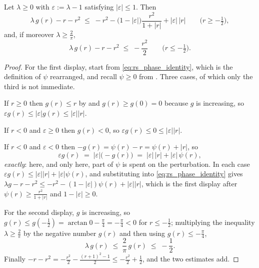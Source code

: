 \begin{lemma}
\label{lem:rs_arctan_perturbed_sharp}
\leanok
{}
Let $\lambda\ge0$ with $\varepsilon:=\lambda-1$ satisfying $\lvert\varepsilon\rvert\le1$.  Then
\[
  \lambda\,g(r)-r-r^{2}\;\le\;-r^{2}
    -\bigl(1-\lvert\varepsilon\rvert\bigr)\frac{r^{2}}{1+\lvert r\rvert}
    +\lvert\varepsilon\rvert\,\lvert r\rvert
  \qquad\bigl(r\ge-\tfrac12\bigr),
\]
and, if moreover $\lambda\ge\tfrac2\pi$,
\[
  \lambda\,g(r)-r-r^{2}\;\le\;-\frac{r^{2}}2\qquad\bigl(r\le-\tfrac12\bigr).
\]
\end{lemma}

\begin{proof}
\leanok
{}
For the first display, start from \eqref{eq:rs_phase_identity}, which is the definition of
$\psi$ rearranged, and recall $\psi\ge0$ from .  Three cases, of which
only the third is not immediate.

If $r\ge0$ then $g(r)\le r$ by  and $g(r)\ge g(0)=0$ because $g$
is increasing, so
$\varepsilon g(r)\le\lvert\varepsilon\rvert g(r)\le\lvert\varepsilon\rvert\lvert r\rvert$.

If $r<0$ and $\varepsilon\ge0$ then $g(r)<0$, so
$\varepsilon g(r)\le0\le\lvert\varepsilon\rvert\lvert r\rvert$.

If $r<0$ and $\varepsilon<0$ then $-g(r)=\psi(r)-r=\psi(r)+\lvert r\rvert$, so
\[
  \varepsilon g(r)\;=\;\lvert\varepsilon\rvert\bigl(-g(r)\bigr)
    \;=\;\lvert\varepsilon\rvert\,\lvert r\rvert+\lvert\varepsilon\rvert\,\psi(r) ,
\]
\emph{exactly}: here, and only here, part of $\psi$ is spent on the perturbation.  In each case
$\varepsilon g(r)\le\lvert\varepsilon\rvert\lvert r\rvert+\lvert\varepsilon\rvert\psi(r)$, and
substituting into \eqref{eq:rs_phase_identity} gives
$\lambda g-r-r^{2}\le-r^{2}-(1-\lvert\varepsilon\rvert)\psi(r)+\lvert\varepsilon\rvert\lvert r\rvert$,
which is the first display after $\psi(r)\ge\tfrac{r^{2}}{1+\lvert r\rvert}$ and
$1-\lvert\varepsilon\rvert\ge0$.

For the second display, $g$ is increasing, so $g(r)\le g(-\tfrac12)=\arctan0-\tfrac\pi4
=-\tfrac\pi4<0$ for $r\le-\tfrac12$; multiplying the inequality $\lambda\ge\tfrac2\pi$ by the
negative number $g(r)$ and then using $g(r)\le-\tfrac\pi4$,
\[
  \lambda\,g(r)\;\le\;\frac2\pi\,g(r)\;\le\;-\frac12 .
\]
Finally $-r-r^{2}=-\tfrac{r^{2}}2-\tfrac{(r+1)^{2}-1}2\le-\tfrac{r^{2}}2+\tfrac12$, and the two
estimates add.
\end{proof}

